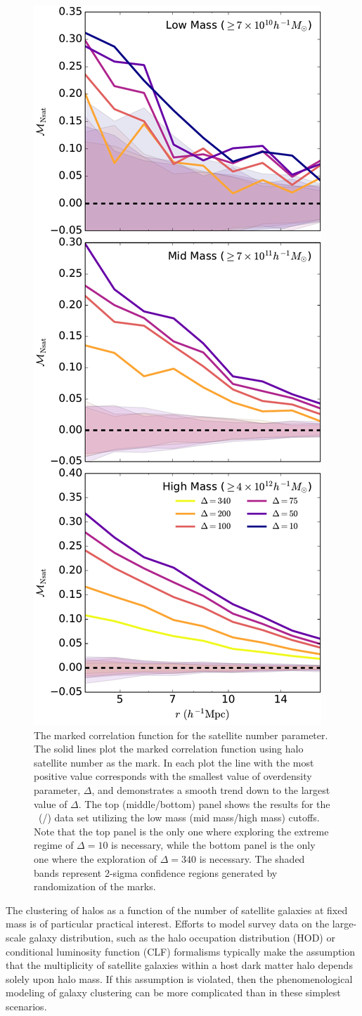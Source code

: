 \documentclass[usenatbib]{mnras}
\begin{document}
\begin{figure}
	\centering
	\includegraphics[width=.4\textwidth]{all_mcf_nsat.pdf}
	\caption{The marked correlation function for the satellite number parameter. The solid lines plot the marked correlation function using halo satellite number as the mark. In each plot the line with the most 
positive value corresponds with the smallest value of overdensity parameter, 
$\Delta$, and demonstrates a smooth trend down to the largest value of 
$\Delta$. The top (middle/bottom) panel shows the results for the
\simA \ (\simB /\simC) data set utilizing the low mass (mid mass/high mass) cutoffs. Note
that the top panel is the only one where exploring the extreme regime of $\Delta = 10$ is
necessary, while the bottom panel is the only one where the exploration of $\Delta = 340$
is necessary. The shaded bands represent 2-sigma confidence regions generated by randomization of the marks.}
	\label{fig:cc_mcf_nsat}
\end{figure}


The clustering of halos as a function of the number of satellite galaxies at fixed mass is of 
particular practical interest. Efforts to model survey data on the large-scale galaxy distribution, 
such as the halo occupation distribution (HOD) or conditional luminosity function (CLF) formalisms 
typically make the assumption that the multiplicity of satellite galaxies within a host dark matter 
halo depends solely upon halo mass. If this assumption is violated, then the phenomenological 
modeling of galaxy clustering can be more complicated than in these simplest scenarios.
\end{document}
